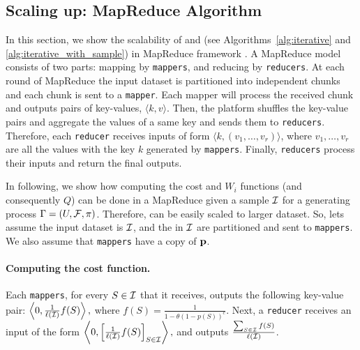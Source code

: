 \subsection{Scaling up: MapReduce Algorithm}\label{sec:mapreduce}
In this section, we show the scalability of {\optimizer} and {\appoptimizer} (see Algorithms~\ref{alg:iterative} and \ref{alg:iterative_with_sample}) in MapReduce framework \cite{dean2008mapreduce}. A MapReduce model consists of two parts: mapping by \texttt{mappers}, and reducing by \texttt{reducers}. At each round of MapReduce the input dataset is partitioned into independent chunks and each chunk is sent to a \texttt{mapper}. Each mapper will process the received chunk and outputs pairs of key-values, $\langle k, v \rangle$. Then, the  platform shuffles the key-value pairs and aggregate the values of a same key and sends them to \texttt{reducers}. Therefore, each \texttt{reducer} receives inputs of form $\langle k, (v_1, \ldots, v_r) \rangle$, where $v_1, \ldots, v_r$ are all the values with the key $k$ generated by \texttt{mappers}. Finally, \texttt{reducers} process their inputs and return the final outputs.

In following, we show how computing the cost and $W_i$ functions (and consequently $Q$)  can be done in a MapReduce given a sample $\S$ for a generating process $\sys=(U,\F,\pi)$. Therefore, {\appoptimizer} can be easily scaled to larger dataset.
So, lets assume the input dataset is $\S$, and the {\ins} in $\S$ are partitioned and sent to \texttt{mappers}. We also assume that \texttt{mappers} have a copy of $\p$. 


\paragraph{\bf Computing the cost function.}
Each \texttt{mappers}, for every $S\in \S$ that it receives, outputs the following key-value pair:
$\left\langle 0,  \frac{1}{\ell(\S)}f(S) \right\rangle,$
where $f(S) = \frac{1}{1- \theta(1-p(S))^c}$.
Next, a \texttt{reducer} receives an input of the form 
$\left\langle 0,  \left[\frac{1}{\ell(\S)}f(S)\right]_{S\in \S}  \right\rangle,$
and outputs $\frac{\sum_{S\in \S}f(S)}{\ell(\S)}$.

